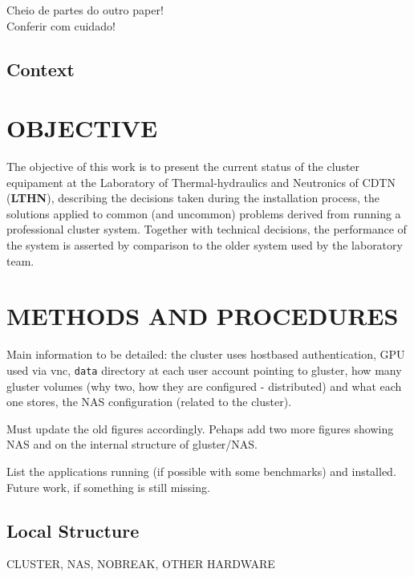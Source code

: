 \documentclass[twoside,a4paper,12pt,english]{inac19}
\begin{document}
{\Huge Cheio de partes do outro paper!}\\
{\Huge Conferir com cuidado!}\\



\subsection{Context}


\section{OBJECTIVE}

The objective of this work is to present the current status of the cluster equipament 
at the Laboratory of Thermal-hydraulics and Neutronics of CDTN (\textbf{LTHN}), describing the decisions 
taken during the installation process, the solutions applied to common (and uncommon) problems 
derived from running a professional cluster system. Together with technical decisions, the 
performance of the system is asserted by comparison to the older system used by the laboratory 
team. 

\section{METHODS AND PROCEDURES}

Main information to be detailed: the cluster uses hostbased authentication, GPU used via 
vnc, \texttt{data} directory at each user account pointing to gluster, how many gluster 
volumes (why two, how they are configured - distributed) and what each one stores, 
the NAS configuration (related to the cluster).

Must update the old figures accordingly. Pehaps add two more figures showing NAS 
and on the internal structure of gluster/NAS.

List the applications running (if possible with some benchmarks) and installed. 
Future work, if something is still missing.

\subsection{Local Structure}
CLUSTER, NAS, NOBREAK, OTHER HARDWARE
\end{document}
